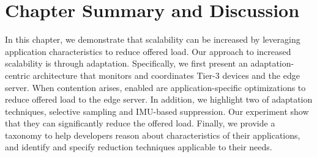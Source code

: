 




\section{Chapter Summary and Discussion}
\label{sec:workload-reduction-summary}

In this chapter, we demonstrate that scalability can be increased by leveraging
application characteristics to reduce offered load. Our approach to increased
scalability is through adaptation. Specifically, we first present an
adaptation-centric architecture that monitors and coordinates Tier-3 devices and
the edge server. When contention arises, enabled are application-specific
optimizations to reduce offered load to the edge server. In addition, we highlight
two of adaptation techniques, selective sampling and IMU-based suppression. Our
experiment show that they can significantly reduce the offered load. Finally, we
provide a taxonomy to help developers reason about characteristics of their
applications, and identify and specify reduction techniques applicable to their
needs.

